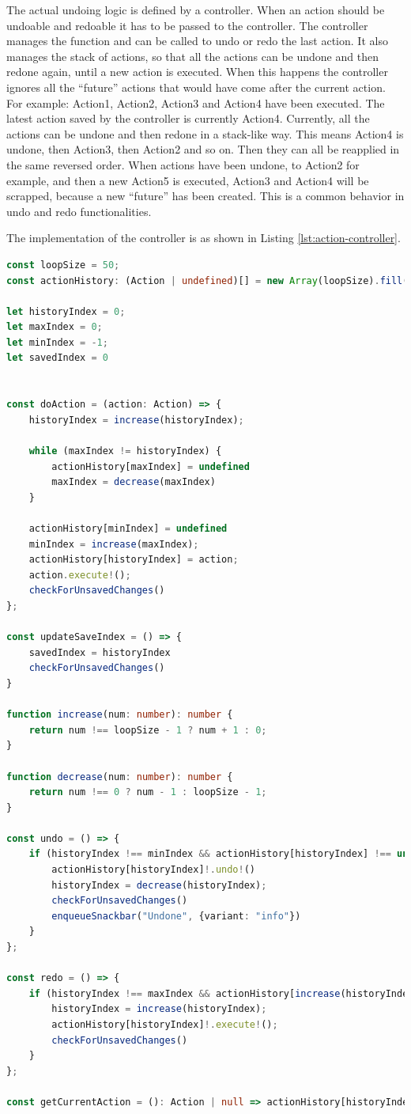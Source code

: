 The actual undoing logic is defined by a controller. When an action should be undoable and redoable it has to be passed to the controller. The controller manages the function and can be called to undo or redo the last action. It also manages the stack of actions, so that all the actions can be undone and then redone again, until a new action is executed. When this happens the controller ignores all the ``future'' actions that would have come after the current action. For example: Action1, Action2, Action3 and Action4 have been executed. The latest action saved by the controller is currently Action4. Currently, all the actions can be undone and then redone in a stack-like way. This means Action4 is undone, then Action3, then Action2 and so on. Then they can all be reapplied in the same reversed order. When actions have been undone, to Action2 for example, and then a new Action5 is executed, Action3 and Action4 will be scrapped, because a new ``future'' has been created. This is a common behavior in undo and redo functionalities.

The implementation of the controller is as shown in Listing \ref{lst:action-controller}.

\begin{lstlisting}[language=TypeScript,caption={Action controller implementation},label={lst:action-controller}]
const loopSize = 50;
const actionHistory: (Action | undefined)[] = new Array(loopSize).fill(undefined);

let historyIndex = 0;
let maxIndex = 0;
let minIndex = -1;
let savedIndex = 0


const doAction = (action: Action) => {
    historyIndex = increase(historyIndex);

    while (maxIndex != historyIndex) {
        actionHistory[maxIndex] = undefined
        maxIndex = decrease(maxIndex)
    }

    actionHistory[minIndex] = undefined
    minIndex = increase(maxIndex);
    actionHistory[historyIndex] = action;
    action.execute!();
    checkForUnsavedChanges()
};

const updateSaveIndex = () => {
    savedIndex = historyIndex
    checkForUnsavedChanges()
}

function increase(num: number): number {
    return num !== loopSize - 1 ? num + 1 : 0;
}

function decrease(num: number): number {
    return num !== 0 ? num - 1 : loopSize - 1;
}

const undo = () => {
    if (historyIndex !== minIndex && actionHistory[historyIndex] !== undefined) {
        actionHistory[historyIndex]!.undo!()
        historyIndex = decrease(historyIndex);
        checkForUnsavedChanges()
        enqueueSnackbar("Undone", {variant: "info"})
    }
};

const redo = () => {
    if (historyIndex !== maxIndex && actionHistory[increase(historyIndex)] !== undefined) {
        historyIndex = increase(historyIndex);
        actionHistory[historyIndex]!.execute!();
        checkForUnsavedChanges()
    }
};

const getCurrentAction = (): Action | null => actionHistory[historyIndex] ?? null;
\end{lstlisting}

